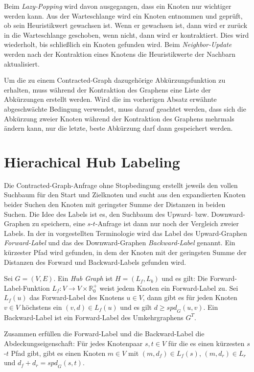 Beim \emph{Lazy-Popping} wird davon ausgegangen, dass ein Knoten nur wichtiger werden kann.
Aus der Warteschlange wird ein Knoten entnommen und geprüft, ob sein Heuristikwert gewachsen ist.
Wenn er gewachsen ist, dann wird er zurück in die Warteschlange geschoben, wenn nicht, dann wird er kontraktiert.
Dies wird wiederholt, bis schließlich ein Knoten gefunden wird.
Beim \emph{Neighbor-Update} werden nach der Kontraktion eines Knotens die Heuristikwerte der Nachbarn aktualisiert.

Um die zu einem Contracted-Graph dazugehörige Abkürzungsfunktion zu erhalten, muss während der Kontraktion des Graphens eine Liste der Abkürzungen erstellt werden.
Wird die im vorherigen Absatz erwähnte abgeschwächte Bedingung verwendet, muss darauf geachtet werden, dass sich die Abkürzung zweier Knoten während der Kontraktion des Graphens mehrmals ändern kann, nur die letzte, beste Abkürzung darf dann gespeichert werden.

\section{Hierachical Hub Labeling}\label{chapter:hl}

Die Contracted-Graph-Anfrage ohne Stopbedingung erstellt jeweils den vollen Suchbaum für den Start und Zielknoten und sucht aus den expandierten Knoten beider Suchen den Knoten mit geringster Summe der Distanzen in beiden Suchen.
Die Idee des Labels ist es, den Suchbaum des Upward- bzw. Downward-Graphen zu speichern, eine $s$-$t$-Anfrage ist dann nur noch der Vergleich zweier Labels.
In der in \cite{abraham2011hub} vorgestellten Terminologie wird das Label des Upward-Graphen \emph{Forward-Label} und das des Downward-Graphen \emph{Backward-Label} genannt.
Ein kürzester Pfad wird gefunden, in dem der Knoten mit der geringsten Summe der Distanzen des Forward und Backward-Labels gefunden wird.

\begin{definition}
  Sei $G = (V, E)$.
  Ein \emph{Hub Graph} ist $H = (L_f, L_b)$ und es gilt:
  Die Forward-Label-Funktion $L_f \colon V \to V \times \mathbb{R}^+_0$ weist jedem Knoten ein Forward-Label zu.
  Sei $L_f (u)$ das Forward-Label des Knotens $u \in V$, dann gibt es für jeden Knoten $v \in V$ höchstens ein $(v, d) \in L_f (u)$ und es gilt $d \geq {spd}_G(u, v)$.
  Ein Backward-Label ist ein Forward-Label des Umkehrgraphens $G^T$.

  Zusammen erfüllen die Forward-Label und die Backward-Label die Abdeckungseigenschaft:
  Für jedes Knotenpaar $s, t \in V$ für die es einen kürzesten $s$-$t$ Pfad gibt, gibt es einen Knoten $m \in V$ mit $(m, d_f) \in L_f (s)$, $(m, d_r) \in L_r$ und $d_f + d_r = {spd}_G (s, t)$.
\end{definition}

